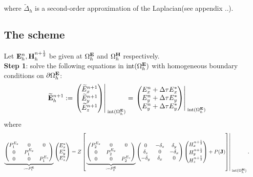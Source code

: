 \documentclass[12pt,reqno]{amsart}
\newcommand{\e}{{\bf E}}
\newcommand{\h}{{\bf H}}
\theoremstyle{definition}
\numberwithin{equation}{section}
\newcommand{\intr}[1]{\mathrm{int}(#1)}
\def\Gwh{\Omega_h}
\begin{document}
where $\tilde{\Delta}_h$ is a second-order approximation of the Laplacian(see appendix ..).
\subsection{The scheme}

	Let $\e^n_h, \h^{n+\frac{1}{2}}_h$  be given at $\Gwh^{\e}$ and $\Gwh^{\h}$ respectively. \\[2mm]
	{\bf Step 1}: solve the following equations in $\intr{\Gwh^{\e}}$ with
	 homogeneous boundary conditions on $\partial \Gwh^\e$: \\[2mm]
	$$
	\widetilde{\e}_h^{n+1}:=
	\left.
	\begin{pmatrix}
		\widetilde{E}_x^{n+1}\\
		\widetilde{E}_y^{n+1}\\
		\widetilde{E}_z^{n+1}
	\end{pmatrix}\right|_{\; \intr{\Gwh^{\e}}}^{\;}=
\left.
	\begin{pmatrix}
		E_x^n+\Delta \tau E_x^{*}\\
		E_y^n+\Delta \tau E_y^{*}\\
		E_y^n+\Delta \tau E_y^{*}
	\end{pmatrix}\right|_{\; \intr{\Gwh^{\e}}}^{\;}
	$$
	where 
	$$
	\underbrace{
	\begin{pmatrix}
		P_1^{E_x} & 0&0 \\
		0 & P_1^{E_y} &\\
		0&0&P_1^{E_z} 
	\end{pmatrix}
}_{:=P_1^\e}
	\begin{pmatrix}
		E_x^{*}\\
		E_y^{*} \\
		E_z^{*}
	\end{pmatrix}=Z
\left [ \left.
	\underbrace{
	\begin{pmatrix}
		P_2^{E_x} & 0&0 \\
		0 & P_2^{E_y} &\\
		0&0&P_2^{E_z} 
	\end{pmatrix}
}_{:=P_2^\e}
	\begin{pmatrix}
		0& -\delta_z & \delta _y\\
		\delta_z&0&-\delta_x\\
		-\delta_y&\delta_x&0
	\end{pmatrix}
	\begin{pmatrix}
		H_x^{n+\frac{1}{2}}\\
		H_y^{n+\frac{1}{2}}\\
		H_z^{n+\frac{1}{2}}
	\end{pmatrix}+P({\bf J})\right]\right|_{\; \intr{\Gwh^{\h}}}^{\;}.
	$$
\end{document}

